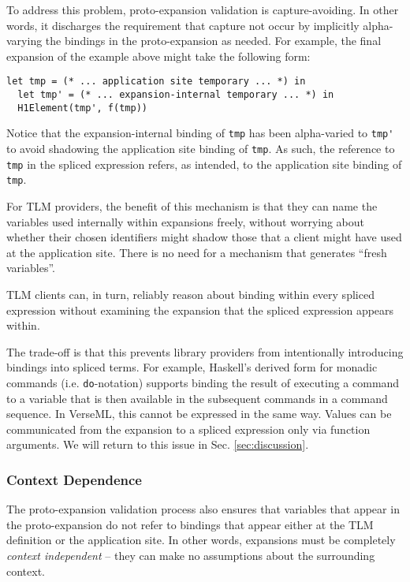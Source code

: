 \documentclass[acmsmall,10pt,review,anonymous]{acmart}\settopmatter{printfolios=true}
\newcommand{\li}[1]{\lstinline{#1}}
\begin{document}
To address this problem, proto-expansion validation is capture-avoiding. In other words, it discharges the requirement that capture not occur by implicitly alpha-varying the bindings in the proto-expansion as needed. For example, the final expansion of the example above might take the following form:
\begin{lstlisting}[numbers=none]
  let tmp = (* ... application site temporary ... *) in 
  let tmp' = (* ... expansion-internal temporary ... *) in 
  H1Element(tmp', f(tmp))
\end{lstlisting}
Notice that the expansion-internal binding of \li{tmp} has been alpha-varied to \li{tmp'} to avoid shadowing the application site binding of \li{tmp}. As such, the reference to \li{tmp} in the spliced expression refers, as intended, to the application site binding of \li{tmp}.

For TLM providers, the benefit of this mechanism is that they can name the variables used internally within expansions freely, without worrying about whether their chosen identifiers might shadow those that a client might have used at the application site. There is no need for a mechanism that generates ``fresh variables''.

TLM clients can, in turn, reliably reason about binding within every spliced expression without examining the expansion that the spliced expression appears within.

The trade-off is that this prevents library providers from intentionally introducing bindings into spliced terms. For example, Haskell's derived form for monadic commands (i.e. \li{do}-notation) supports binding the result of executing a command to a variable that is then available in the subsequent commands in a command sequence. In VerseML, this cannot be expressed in the same way. Values can be communicated from the expansion to a spliced expression only via function arguments. 
We will return to this issue in Sec. \ref{sec:discussion}.


\subsubsection{Context Dependence}\label{sec:context-dependence}
The proto-expansion validation process also ensures that variables that appear in the proto-expansion do not refer to bindings that appear either at the TLM definition or the application site. In other words, expansions must be completely \emph{context independent} -- they can make no assumptions about the surrounding context.
\end{document}
